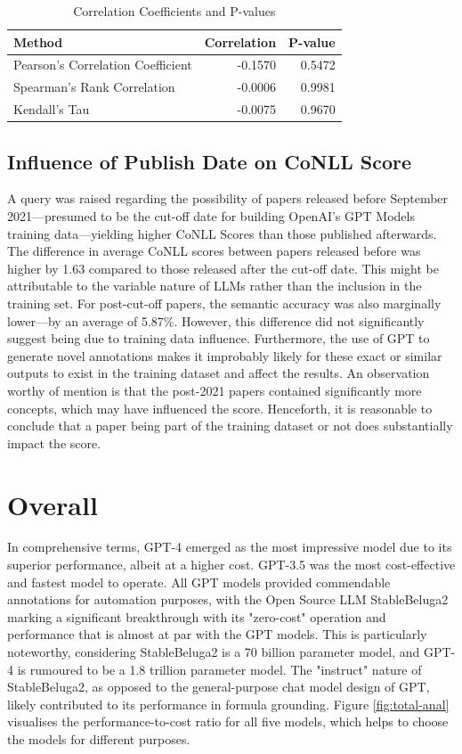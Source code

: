 \begin{table}[htpb]
    \centering
    \caption{Correlation Coefficients and P-values}\label{tab:spearman}
        \begin{tabular}{lrr}
        \hline
        Method & Correlation & P-value \\
        \hline
        Pearson's Correlation Coefficient & -0.1570 & 0.5472 \\
        Spearman's Rank Correlation & -0.0006 & 0.9981 \\
        Kendall's Tau & -0.0075 & 0.9670 \\
        \hline
    \end{tabular}
\end{table}

\subsection{Influence of Publish Date on CoNLL Score}

A query was raised regarding the possibility of papers released before September 2021—presumed to be the cut-off date for building OpenAI's GPT Models training data—yielding higher CoNLL Scores than those published afterwards. The difference in average CoNLL scores between papers released before was higher by 1.63 compared to those released after the cut-off date. This might be attributable to the variable nature of LLMs rather than the inclusion in the training set. For post-cut-off papers, the semantic accuracy was also marginally lower—by an average of 5.87\%. However, this difference did not significantly suggest being due to training data influence.
Furthermore, the use of GPT to generate novel annotations makes it improbably likely for these exact or similar outputs to exist in the training dataset and affect the results. An observation worthy of mention is that the post-2021 papers contained significantly more concepts, which may have influenced the score. Henceforth, it is reasonable to conclude that a paper being part of the training dataset or not does substantially impact the score.

\section{Overall}

In comprehensive terms, GPT-4 emerged as the most impressive model due to its superior performance, albeit at a higher cost. GPT-3.5 was the most cost-effective and fastest model to operate. All GPT models provided commendable annotations for automation purposes, with the Open Source LLM StableBeluga2 marking a significant breakthrough with its "zero-cost" operation and performance that is almost at par with the GPT models. This is particularly noteworthy, considering StableBeluga2 is a 70 billion parameter model, and GPT-4 is rumoured to be a 1.8 trillion parameter model. The "instruct" nature of StableBeluga2, as opposed to the general-purpose chat model design of GPT, likely contributed to its performance in formula grounding. Figure \ref{fig:total-anal} visualises the performance-to-cost ratio for all five models, which helps to choose the models for different purposes.

